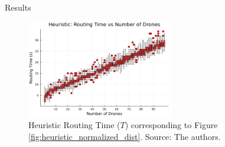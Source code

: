 \begin{frame}{Results}

\begin{figure}[H]
    \centering
    \includegraphics[width=0.57\textwidth]{img/cpp_routing_time_boxplot_vs_drones.png}
    \caption{Heuristic Routing Time ($T$) corresponding to Figure \ref{fig:heuristic_normalized_dist}. Source: The authors.}
    \label{fig:heuristic_normalized_routing_time}
\end{figure}


\end{frame}








	




